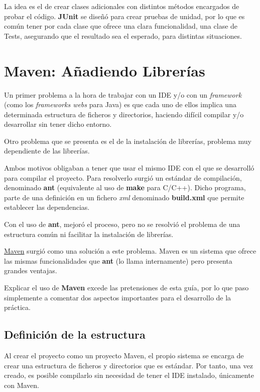 \documentclass[11pt]{article}
\begin{document}
La idea es el de crear clases adicionales con distintos métodos encargados de probar el código. \textbf{JUnit} se diseñó
para crear pruebas de unidad, por lo que es común tener por cada clase que ofrece una clara funcionalidad, una
clase de Tests, asegurando que el resultado sea el esperado, para distintas situaciones.  
\section{Maven: Añadiendo Librerías}
\label{sec-5}
\label{maven}




Un primer problema a la hora de trabajar con un IDE y/o con un \emph{framework} (como los \emph{frameworks webs} para Java) es que cada uno de ellos implica una determinada estructura de ficheros y
directorios, haciendo difícil compilar y/o desarrollar sin tener dicho entorno.


Otro problema que se presenta es el de la instalación de librerías, problema muy dependiente de las librerías. 


Ambos motivos obligaban a tener que usar el mismo IDE con el que se desarrolló para compilar el
proyecto. Para resolverlo surgió un estándar de compilación, denominado \textbf{ant} (equivalente al uso de
\textbf{make} para C/C++). Dicho programa, parte de una definición en un fichero \emph{xml} denominado
\textbf{build.xml} que permite establecer las dependencias.


Con el uso de \textbf{ant}, mejoró el proceso, pero no se resolvió el problema de una estructura común ni
facilitar la instalación de librerías.


\href{http://maven.apache.org/}{Maven} surgió como una solución a este problema. Maven es un sistema que ofrece las mismas funcionalidades
que \textbf{ant} (lo llama internamente) pero presenta grandes ventajas.


Explicar el uso de \textbf{Maven} excede las pretensiones de esta guía, por lo que paso simplemente a comentar dos
aspectos importantes para el desarrollo de la práctica.
\subsection{Definición de la estructura}
\label{sec-5-1}




Al crear el proyecto como un proyecto Maven, el propio sistema se encarga de crear una estructura de ficheros
y directorios que es estándar. Por tanto, una vez creado, es posible compilarlo sin necesidad de tener el IDE instalado, 
únicamente con Maven. 
\end{document}
